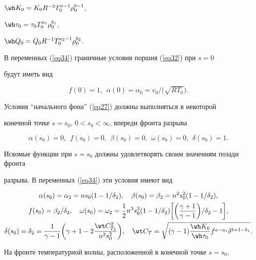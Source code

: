 $\wh K_0=K_0R^{-2}T_0^{a-1}\rho_0^{b-1}$,


$\wh\tau_0=\tau_0T_0^{a_1}\rho_0^{b_1}$,


$\wh Q_0=Q_0R^{-1}T_0^{a_2-1}\rho_0^{b_2}$.


В переменных (\ref{eq34}) граничные условия поршня (\ref{eq32}) при $s=0$


будут иметь вид 


$$


f(0)=1,\ \ \alpha(0)=\alpha_0=v_0/\big(\sqrt{RT_0}\big).


$$


Условия ``начального фона'' (\ref{eq27}) должны выполняться в некоторой


конечной точке $s=s_0$, $0<s_0<\infty$, впереди фронта разрыва


\begin{equation}\label{eq44}


\alpha(s_0)=0,\ \ f(s_0)=0,\ \ \beta(s_0)=0,


\ \ \omega(s_0)=0,\ \ \delta(s_0)=1.


\end{equation}


Искомые функции при $s=s_0$ должны удовлетворять своим значениям позади фронта


разрыва. В переменных (\ref{eq34}) эти условия имеют вид


\begin{gather*}


\alpha(s_0)=\alpha_2=ns_0(1-1/\delta_2),\quad


\beta(s_0)=\beta_2=n^2s_0^2(1-1/\delta_2),\\


%


f(s_0)=\beta_2/\delta_2,\quad


\omega(s_0)=\omega_2=\frac12 n^3s_0^3(1-1/\delta_2)


\bigg[\bigg(\frac{\gamma+1}{\gamma-1}\bigg)/\delta_2-1\bigg],\\


%


\delta(s_0)=\delta_2=\frac{1}{\gamma-1}


\bigg(\gamma+1-2\frac{\wt C_{T_2}^2}{n^2s_0^2}\bigg),\quad


\wt C_T=\sqrt{(\gamma-1)\frac{\wh K_0}{\wh\tau_0}f^{a-a_1}\delta^{b+1-b_1}}.


\end{gather*}


На фронте температурной волны, расположенной в конечной точке $s=s_0$,


